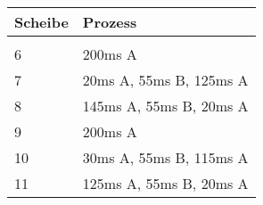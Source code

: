 \documentclass{ti2}
\begin{document}
\begin{table}[htbp]
\begin{tabular}{|l|l|}
\hline
\multicolumn{1}{|l|}{Scheibe } & Prozess \\ \hline
\multicolumn{1}{|l|}{} &  \\ \hline
6 & 200ms A \\ \hline
7 & 20ms A, 55ms B, 125ms A \\ \hline
8 & 145ms A, 55ms B, 20ms A \\ \hline
9 & 200ms A \\ \hline
10 & 30ms A, 55ms B, 115ms A \\ \hline
11 & 125ms A, 55ms B, 20ms A \\ \hline
\end{tabular}
\end{table}
\end{document}
